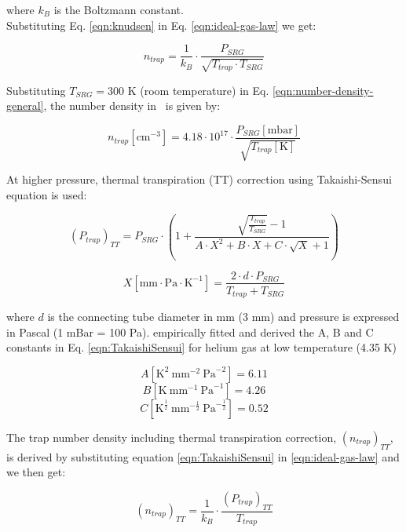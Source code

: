 where $k_B$ is the Boltzmann constant.\\

Substituting Eq. \ref{eqn:knudsen} in Eq. \ref{eqn:ideal-gas-law} we get:

\begin{equation}
    n_{trap} = \frac{1}{k_B} \cdot \frac{P_{SRG}}{\sqrt{T_{trap} \cdot T_{SRG}}}
    \label{eqn:number-density-general}
\end{equation}

Substituting $T_{SRG} = 300$ K (room temperature) in Eq.
\ref{eqn:number-density-general}, the number density in \percc\ is given by:

\begin{equation}
    n_{trap} [\text{cm}^{-3}] = 4.18 \cdot 10^{17} \cdot \frac{P_{SRG}[\text{mbar}]}{\sqrt{T_{trap}[\text{K}]}}
    \label{eqn:number-density-lowP}
\end{equation}

At higher pressure, thermal transpiration (TT) correction using Takaishi-Sensui
\cite{Takaishi1963} equation is used:

\begin{equation}
    \left( P_{trap} \right) _{TT} = P_{SRG} \cdot
    \left(1 + \frac
    {\sqrt{\frac{T_{trap}}{T_{SRG}}} - 1}
    {A \cdot X^2 + B \cdot X + C  \cdot \sqrt{X} + 1}
    \right)
    \label{eqn:TakaishiSensui}
\end{equation}

\begin{equation}
    X[\text{mm} \cdot \text{Pa} \cdot \text{K}^{-1}] = \frac{2 \cdot d \cdot P_{SRG} }{T_{trap} + T_{SRG}}
\end{equation}

where $d$ is the connecting tube diameter in mm (3 mm) and pressure is
expressed in Pascal (1 mBar = 100 Pa). \citet{sanderson_ion_1995} empirically
fitted and derived the A, B and C constants in Eq. \ref{eqn:TakaishiSensui} for
helium gas at low temperature (4.35 K)

\[ A [\text{K}^{2}\ \text{mm}^{-2}\ \text{Pa}^{-2}] = 6.11 \]
\[ B [\text{K}\ \text{mm}^{-1}\ \text{Pa}^{-1}] = 4.26 \]
\[ C [\text{K}^{\frac{1}{2}}\ \text{mm}^{-\frac{1}{2}}\ \text{Pa}^{-\frac{1}{2}}] = 0.52 \]

The trap number density including thermal transpiration correction, $\left(
    n_{trap}\right) _{TT}$, is derived by substituting equation
\ref{eqn:TakaishiSensui} in \ref{eqn:ideal-gas-law} and we then get:

\begin{equation}
    \left( n_{trap}\right) _{TT} =
    \frac{1}{k_B} \cdot
    \frac{ \left( P_{trap} \right) _{TT} }{T_{trap}}
    \label{eqn:number-density-highP}
\end{equation}

